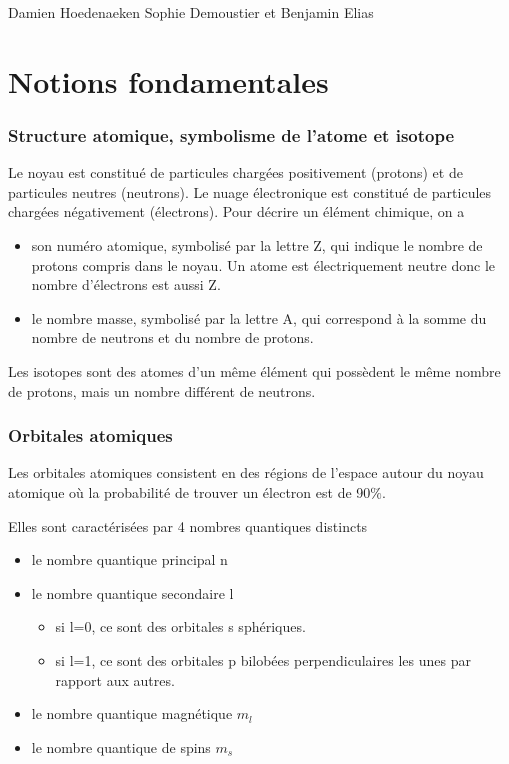 
\usepackage{multirow}
\usepackage[version=3]{mhchem}

\usepackage{layout}

{Damien Hoedenaeken}
{Sophie Demoustier et Benjamin Elias}

\part{Notions fondamentales}
\section{Structure atomique, symbolisme de l'atome et isotope}
Le noyau est constitué de particules chargées positivement (protons) et de particules neutres (neutrons).
Le nuage électronique est constitué de particules chargées négativement (électrons).
Pour décrire un élément chimique, on a
\begin{itemize}
  \item son numéro atomique, symbolisé par la lettre Z, qui indique le nombre de protons compris dans le noyau.
    Un atome est électriquement neutre donc le nombre d'électrons est aussi Z.
  \item le nombre masse, symbolisé par la lettre A, qui correspond à la somme du nombre de neutrons et du nombre de protons.
\end{itemize}
Les isotopes sont des atomes d'un même élément qui possèdent le même nombre de protons, mais un nombre différent de neutrons.
\section{Orbitales atomiques}
Les orbitales atomiques consistent en des régions de l'espace autour du noyau atomique où la probabilité de trouver un électron est de 90$\%$.

Elles sont caractérisées par 4 nombres quantiques distincts
\begin{itemize}
  \item le nombre quantique principal n
  \item le nombre quantique secondaire l
    \begin{itemize}
      \item si l=0, ce sont des orbitales s sphériques.
      \item si l=1, ce sont des orbitales p bilobées perpendiculaires les unes par rapport aux autres.
    \end{itemize}
  \item le nombre quantique magnétique $m_l$
  \item le nombre quantique de spins $m_s$
\end{itemize}


